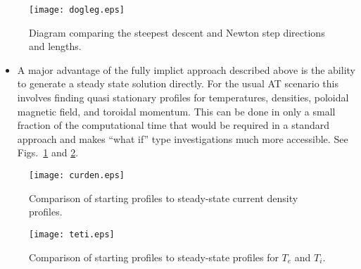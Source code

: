 \begin{figure}
 \texttt{[image: dogleg.eps]}
 \caption{Diagram comparing the steepest descent and Newton step directions and lengths.}
\end{figure}


\begin{itemize}
 \item A major  advantage of the  fully implict approach described above is the
 ability to generate a steady state solution directly. For the usual AT scenario
 this involves finding quasi stationary profiles for temperatures, densities,
 poloidal magnetic field, and toroidal momentum.  This can be done in
 only a small fraction of the computational time that would be required in a
 standard  approach and makes ``what if'' type investigations much more
 accessible.  See Figs.~\ref{j_steady} and \ref{teti_steady}.
\end{itemize}
\begin{figure}
 \texttt{[image: curden.eps]}
 \caption{Comparison of starting profiles to steady-state current density profiles.\label{j_steady}}
\end{figure}
\begin{figure}
 \texttt{[image: teti.eps]}
 \caption{Comparison of starting profiles to steady-state profiles for $T_e$ and $T_i$.\label{teti_steady}}
\end{figure}

